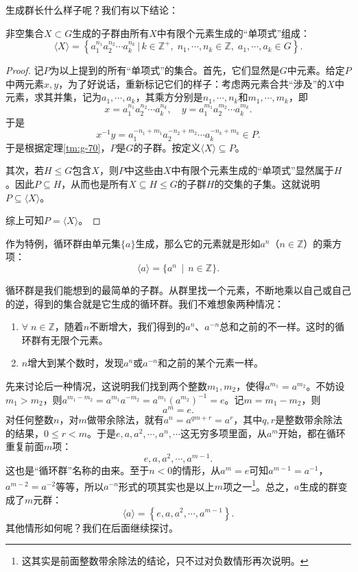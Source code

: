 \documentclass[12pt,UTF8,fontset=none]{ctexbook}
\begin{document}
生成群长什么样子呢？我们有以下结论：
\begin{tm}
    非空集合$X\subset G$生成的子群由所有$X$中有限个元素生成的“单项式”组成：
    $$ \langle X\rangle = \left\{a_1^{n_1}a_2^{n_2}\cdots a_k^{n_k}\,\big|\,k\in \mathbb{Z}^+,\; n_1,\cdots, n_k\in\mathbb{Z},\;a_1,\cdots,a_k\in G\right\}. $$
\end{tm}
\begin{proof}
    记$P$为以上提到的所有“单项式”的集合。首先，它们显然是$G$中元素。给定$P$中两元素$x,y$，为了好说话，重新标记它们的样子：考虑两元素合共“涉及”的$X$中元素，求其并集，记为$a_1,\cdots, a_k$，其乘方分别是$n_1,\cdots,n_k$和$m_1,\cdots,m_k$，即
    $$ x = a_1^{n_1}a_2^{n_2}\cdots a_k^{n_k},\quad y = a_1^{m_1}a_2^{m_2}\cdots a_k^{m_k}. $$
    于是
    $$ x^{-1}y = a_1^{-n_1+m_1}a_2^{-n_2+m_2}\cdots a_k^{-n_k+m_k}\in P. $$
    于是根据定理\ref{tm:g-70}，$P$是$G$的子群。按定义$\langle X\rangle \subseteq P$。

    其次，若$H\leq G$包含$X$，则$P$中这些由$X$中有限个元素生成的“单项式”显然属于$H$。因此$P\subseteq H$，从而也是所有$X\subseteq H\leq G$的子群$H$的交集的子集。这就说明$P\subseteq \langle X\rangle$。

    综上可知$P = \langle X\rangle$。
\end{proof}

作为特例，循环群由单元集$\{a\}$生成，那么它的元素就是形如$a^n$（$n\in\mathbb{Z}$）的乘方项：
$$ \langle a\rangle = \{a^n \, \mid \, n\in\mathbb{Z}\}. $$

循环群是我们能想到的最简单的子群。从群里找一个元素，不断地乘以自己或自己的逆，得到的集合就是它生成的循环群。我们不难想象两种情况：
\begin{enumerate}[label=\arabic*.]
    \item $\forall \; n\in \mathbb{Z}$，随着$n$不断增大，我们得到的$a^n$、$a^{-n}$总和之前的不一样。这时的循环群有无限个元素。
    \item $n$增大到某个数时，发现$a^n$或$a^{-n}$和之前的某个元素一样。
\end{enumerate}
先来讨论后一种情况，这说明我们找到两个整数$m_1,m_2$，使得$a^{m_1} = a^{m_2}$。不妨设$m_1>m_2$，则$a^{m_1-m_2} = a^{m_1}a^{-m_2} = a^{m_1}\left(a^{m_2}\right)^{-1} = e$。记$m = m_1 - m_2$，则
$$ a^m = e. $$
对任何整数$n$，对$m$做带余除法，就有$a^n = a^{qm+r} = a^r$，其中$q,r$是整数带余除法的结果，$0\leqslant r < m$。于是$e, a, a^2, \cdots, a^n, \cdots$这无穷多项里面，从$a^m$开始，都在循环重复前面$m$项：
$$ e, a, a^2, \cdots, a^{m-1}.$$
这也是“循环群”名称的由来。至于$n<0$的情形，从$ a^m = e$可知$a^{m-1} = a^{-1}$，$a^{m-2} = a^{-2}$等等，所以$a^{-n}$形式的项其实也是以上$m$项之一\footnote{这其实是前面整数带余除法的结论，只不过对负数情形再次说明。}。总之，$a$生成的群变成了$m$元群：
$$ \langle a\rangle = \left\{ e, a, a^2, \cdots, a^{m-1} \right\}. $$
其他情形如何呢？我们在后面继续探讨。
\end{document}
